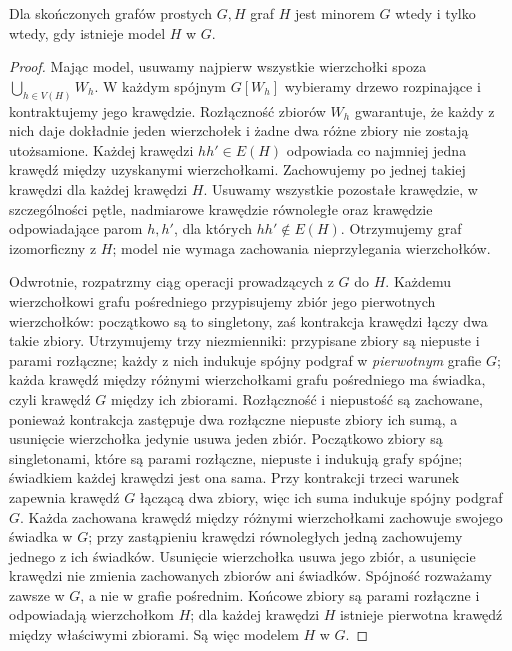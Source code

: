 \begin{lemat}
\label{lem:tg-kuratowski-model-minor}
Dla skończonych grafów prostych $G,H$
graf $H$ jest minorem $G$ wtedy i tylko wtedy,
gdy istnieje model $H$ w $G$.
\end{lemat}
\begin{proof}
Mając model, usuwamy najpierw wszystkie wierzchołki
spoza $\bigcup_{h\in V(H)}W_h$. W każdym spójnym
$G[W_h]$ wybieramy drzewo rozpinające i kontraktujemy
jego krawędzie. Rozłączność zbiorów $W_h$ gwarantuje,
że każdy z nich daje dokładnie jeden wierzchołek
i żadne dwa różne zbiory nie zostają utożsamione.
Każdej krawędzi $hh'\in E(H)$ odpowiada co najmniej
jedna krawędź między uzyskanymi wierzchołkami.
Zachowujemy po jednej takiej krawędzi dla każdej
krawędzi $H$. Usuwamy wszystkie pozostałe krawędzie,
w szczególności pętle, nadmiarowe krawędzie równoległe
oraz krawędzie odpowiadające parom $h,h'$,
dla których $hh'\notin E(H)$. Otrzymujemy graf
izomorficzny z $H$; model nie wymaga zachowania
nieprzylegania wierzchołków.

Odwrotnie, rozpatrzmy ciąg operacji
prowadzących z $G$ do $H$.
Każdemu wierzchołkowi grafu pośredniego
przypisujemy zbiór jego pierwotnych
wierzchołków: początkowo są to singletony,
zaś kontrakcja krawędzi łączy dwa
takie zbiory. Utrzymujemy trzy niezmienniki: przypisane zbiory
są niepuste i parami rozłączne; każdy z nich indukuje
spójny podgraf w \emph{pierwotnym} grafie $G$;
każda krawędź między różnymi wierzchołkami grafu
pośredniego ma świadka, czyli krawędź $G$ między ich
zbiorami. Rozłączność i niepustość są zachowane,
ponieważ kontrakcja zastępuje dwa rozłączne niepuste
zbiory ich sumą, a usunięcie wierzchołka jedynie
usuwa jeden zbiór.
Początkowo zbiory są singletonami, które są parami
rozłączne, niepuste i indukują grafy spójne; świadkiem
każdej krawędzi jest ona sama. Przy kontrakcji
trzeci warunek zapewnia krawędź $G$ łączącą dwa zbiory,
więc ich suma indukuje spójny podgraf $G$.
Każda zachowana krawędź między różnymi wierzchołkami
zachowuje swojego świadka w $G$; przy zastąpieniu
krawędzi równoległych jedną zachowujemy jednego
z ich świadków. Usunięcie wierzchołka usuwa jego
zbiór, a usunięcie krawędzi nie zmienia zachowanych
zbiorów ani świadków. Spójność rozważamy zawsze
w $G$, a nie w grafie pośrednim. Końcowe zbiory
są parami rozłączne i odpowiadają
wierzchołkom $H$; dla każdej
krawędzi $H$ istnieje pierwotna
krawędź między właściwymi zbiorami.
Są więc modelem $H$ w $G$.
\end{proof}

